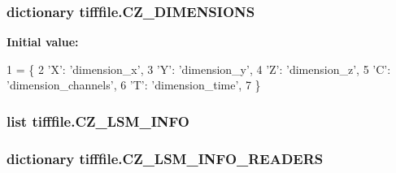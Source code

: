 \hypertarget{namespacetifffile_abad05e22bf2ebf7ab5ccedf0808acd55}{
\subsubsection[{C\-Z\-\_\-\-D\-I\-M\-E\-N\-S\-I\-O\-N\-S}]{\setlength{\rightskip}{0pt plus 5cm}dictionary tifffile.\-C\-Z\-\_\-\-D\-I\-M\-E\-N\-S\-I\-O\-N\-S}}\label{namespacetifffile_abad05e22bf2ebf7ab5ccedf0808acd55}
{\bfseries Initial value\-:}
\begin{DoxyCode}
1 = \{
2     \textcolor{stringliteral}{'X'}: \textcolor{stringliteral}{'dimension\_x'},
3     \textcolor{stringliteral}{'Y'}: \textcolor{stringliteral}{'dimension\_y'},
4     \textcolor{stringliteral}{'Z'}: \textcolor{stringliteral}{'dimension\_z'},
5     \textcolor{stringliteral}{'C'}: \textcolor{stringliteral}{'dimension\_channels'},
6     \textcolor{stringliteral}{'T'}: \textcolor{stringliteral}{'dimension\_time'},
7 \}
\end{DoxyCode}
\hypertarget{namespacetifffile_a7b9a234cc0e12ba5cd6793933eb68f6a}{
\subsubsection[{C\-Z\-\_\-\-L\-S\-M\-\_\-\-I\-N\-F\-O}]{\setlength{\rightskip}{0pt plus 5cm}list tifffile.\-C\-Z\-\_\-\-L\-S\-M\-\_\-\-I\-N\-F\-O}}\label{namespacetifffile_a7b9a234cc0e12ba5cd6793933eb68f6a}
\hypertarget{namespacetifffile_a62f6bd5ddecc587462ec2c4665c1723d}{
\subsubsection[{C\-Z\-\_\-\-L\-S\-M\-\_\-\-I\-N\-F\-O\-\_\-\-R\-E\-A\-D\-E\-R\-S}]{\setlength{\rightskip}{0pt plus 5cm}dictionary tifffile.\-C\-Z\-\_\-\-L\-S\-M\-\_\-\-I\-N\-F\-O\-\_\-\-R\-E\-A\-D\-E\-R\-S}}\label{namespacetifffile_a62f6bd5ddecc587462ec2c4665c1723d}
